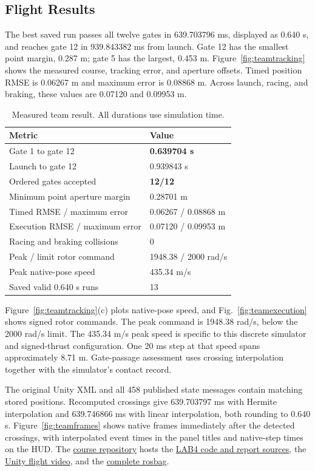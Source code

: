 \documentclass[letterpaper,10pt,conference]{ieeeconf}
\begin{document}
\subsection{Flight Results}
The best saved run passes all twelve gates in 639.703796 ms, displayed as 0.640 s, and reaches gate 12 in 939.843382 ms from launch.
Gate 12 has the smallest point margin, 0.287 m; gate 5 has the largest, 0.453 m.
Figure~\ref{fig:teamtracking} shows the measured course, tracking error, and aperture offsets.
Timed position RMSE is 0.06267 m and maximum error is 0.08868 m.
Across launch, racing, and braking, these values are 0.07120 and 0.09953 m.

\begin{table}[!ht]\centering\small
\caption{Measured team result. All durations use simulation time.}
\label{tab:teamresult}
\renewcommand{\arraystretch}{1.09}
\begin{tabularx}{\columnwidth}{Yl}\toprule
Metric&Value\\\midrule
Gate 1 to gate 12&\textbf{0.639704 s}\\
Launch to gate 12&0.939843 s\\
Ordered gates accepted&\textbf{12/12}\\
Minimum point aperture margin&0.28701 m\\
Timed RMSE / maximum error&0.06267 / 0.08868 m\\
Execution RMSE / maximum error&0.07120 / 0.09953 m\\
Racing and braking collisions&0\\
Peak / limit rotor command&1948.38 / 2000 rad/s\\
Peak native-pose speed&435.34 m/s\\
Saved valid 0.640 s runs&13\\\bottomrule
\end{tabularx}
\end{table}

Figure~\ref{fig:teamtracking}(c) plots native-pose speed, and Fig.~\ref{fig:teamexecution} shows signed rotor commands.
The peak command is 1948.38 rad/s, below the 2000 rad/s limit.
The 435.34 m/s peak speed is specific to this discrete simulator and signed-thrust configuration.
One 20 ms step at that speed spans approximately 8.71 m.
Gate-passage assessment uses crossing interpolation together with the simulator's contact record.

The original Unity XML and all 458 published state messages contain matching stored positions.
Recomputed crossings give 639.703797 ms with Hermite interpolation and 639.746866 ms with linear interpolation, both rounding to 0.640 s.
Figure~\ref{fig:teamframes} shows native frames immediately after the detected crossings, with interpolated event times in the panel titles and native-step times on the HUD.
The \href{https://github.com/BBOOOKK/summer_2026}{course repository} hosts the \href{https://github.com/BBOOOKK/summer_2026/tree/main/Lab4}{LAB4 code and report sources}, the \href{https://github.com/BBOOOKK/summer_2026/blob/main/Lab4/24020036035_ShuyuLi_Lab4/team\%20task/flight.mp4}{Unity flight video}, and the \href{https://github.com/BBOOOKK/summer_2026/blob/main/Lab4/24020036035_ShuyuLi_Lab4/team\%20task/data/race.bag}{complete rosbag}.
\end{document}
